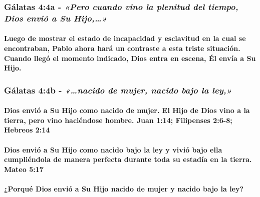\documentclass[11a pt,twoside]{article}
\newcommand{\scripture}[1]{%
  {\fontsize{12pt}{16pt}\selectfont\ScriptureFont\itshape #1}%
}
\let\oldsubsubsection\subsubsection
\renewcommand{\subsubsection}{\needspace{4\baselineskip}\oldsubsubsection}
\let\oldparagraph\paragraph
\renewcommand{\paragraph}{\needspace{3\baselineskip}\oldparagraph}
\begin{document}
\subsubsection{\texorpdfstring{Gálatas 4:4a -
\scripture{«Pero cuando vino la plenitud del tiempo, Dios envió a Su Hijo,…»}}{Gálatas 4:4a - }}\label{guxe1latas-44a---pero-cuando-vino-la-plenitud-del-tiempo-dios-enviuxf3-a-su-hijo}

\paragraph{Luego de mostrar el estado de incapacidad y esclavitud en la
cual se encontraban, Pablo ahora hará un contraste a esta triste
situación. Cuando llegó el momento indicado, Dios entra en escena, Él
envía a Su
Hijo.}\label{luego-de-mostrar-el-estado-de-incapacidad-y-esclavitud-en-la-cual-se-encontraban-pablo-ahora-haruxe1-un-contraste-a-esta-triste-situaciuxf3n.-cuando-lleguxf3-el-momento-indicado-dios-entra-en-escena-uxe9l-envuxeda-a-su-hijo.}

\subsubsection{\texorpdfstring{Gálatas 4:4b -
\scripture{«…nacido de mujer, nacido bajo la ley,»}}{Gálatas 4:4b - }}\label{guxe1latas-44b---nacido-de-mujer-nacido-bajo-la-ley}

\paragraph{Dios envió a Su Hijo como nacido de mujer. El Hijo de Dios
vino a la tierra, pero vino haciéndose hombre. Juan 1:14; Filipenses
2:6-8; Hebreos
2:14}\label{dios-enviuxf3-a-su-hijo-como-nacido-de-mujer.-el-hijo-de-dios-vino-a-la-tierra-pero-vino-haciuxe9ndose-hombre.-juan-114-filipenses-26-8-hebreos-214}

\paragraph{Dios envió a Su Hijo como nacido bajo la ley y vivió bajo
ella cumpliéndola de manera perfecta durante toda su estadía en la
tierra. Mateo
5:17}\label{dios-enviuxf3-a-su-hijo-como-nacido-bajo-la-ley-y-viviuxf3-bajo-ella-cumpliuxe9ndola-de-manera-perfecta-durante-toda-su-estaduxeda-en-la-tierra.-mateo-517}

\paragraph{¿Porqué Dios envió a Su Hijo nacido de mujer y nacido bajo la
ley?}\label{porquuxe9-dios-enviuxf3-a-su-hijo-nacido-de-mujer-y-nacido-bajo-la-ley}
\end{document}
